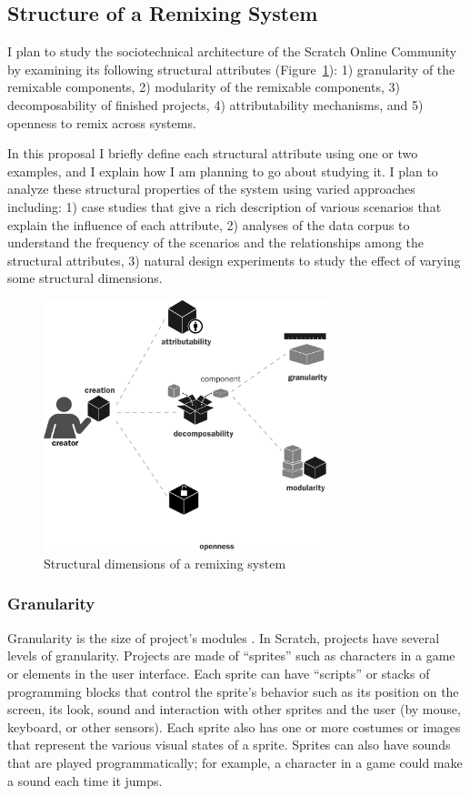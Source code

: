 \subsection{Structure of a Remixing System} 
I plan to study the sociotechnical architecture of the Scratch Online Community by examining its following structural attributes (Figure~\ref{fig:structure}):
1) granularity of the remixable components, 
2) modularity of the remixable components, 
3) decomposability of finished projects, 
4) attributability mechanisms, and 
5) openness to remix across systems.

In this proposal I briefly define each structural attribute using one or two examples, and I explain how I am planning to go about studying it.
I plan to analyze these structural properties of the system using varied approaches including:
1) case studies that give a rich description of various scenarios that explain the influence of each attribute,
2) analyses of the data corpus to understand the frequency of the scenarios and the relationships among the structural attributes,
3) natural design experiments to study the effect of varying some structural dimensions.

\begin{figure} 
\centering
\includegraphics[width=3.25in]{figures/structure.pdf}
\caption{Structural dimensions of a remixing system}
\label{fig:structure}
\end{figure}

\subsubsection{Granularity}
Granularity is the size of project's modules \citep{benkler_coases_2002}. 
In Scratch, projects have several levels of granularity.
Projects are made of ``sprites'' such as characters in a game or elements in the user interface.
Each sprite can have ``scripts'' or stacks of programming blocks that control the sprite's behavior such as its position on the screen, its look, sound and interaction with other sprites and the user (by mouse, keyboard, or other sensors).
Each sprite also has one or more costumes or images that represent the various visual states of a sprite.
Sprites can also have sounds that are played programmatically; for example, a character in a game could make a sound each time it jumps.

